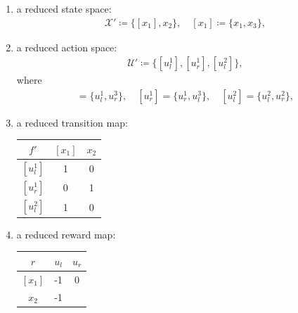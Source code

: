 \documentclass[10pt,leqno]{amsart}
\newcommand{\U}{\mathcal{U}}
\newcommand{\X}{\mathcal{X}}
\newcommand{\cost}{r}
\begin{document}
\begin{enumerate}[label=$\rhd$]
    \item a reduced state space:
    \begin{align*}
        \X' \coloneqq \{[x_1], x_2\}, \quad [x_1] \coloneqq \{x_1, x_3\},
    \end{align*}
    \item a reduced action space:
    \begin{align*}
        \U' \coloneqq \{[u_l^1], [u_r^1], [u_l^2]\},
    \end{align*}
    where
    \begin{align*}
        [u_l^1] = \{u_l^1, u_r^3\}, \quad [u_r^1] = \{u_r^1, u_l^3\}, \quad [u_l^2] = \{u_l^2, u_r^2\},
    \end{align*}
    \item a reduced transition map:
    \begin{center}
        \begin{tabular}[]{c|cc}
            $f'$ & $[x_1]$ & $x_2$\\
            \hline
            $[u_l^1]$ & 1 & 0\\
            $[u_r^1]$ & 0 & 1\\
            $[u_l^2]$ & 1 & 0
        \end{tabular}
    \end{center}
    \item a reduced reward map:
    \begin{center}
        \begin{tabular}[]{c|cc}
            $\cost$ & $u_l$ & $u_r$\\
            \hline
            $[x_1]$ & -1 & 0\\
            $x_2$ & -1 & 
        \end{tabular}
    \end{center}
\end{enumerate}
\end{document}
